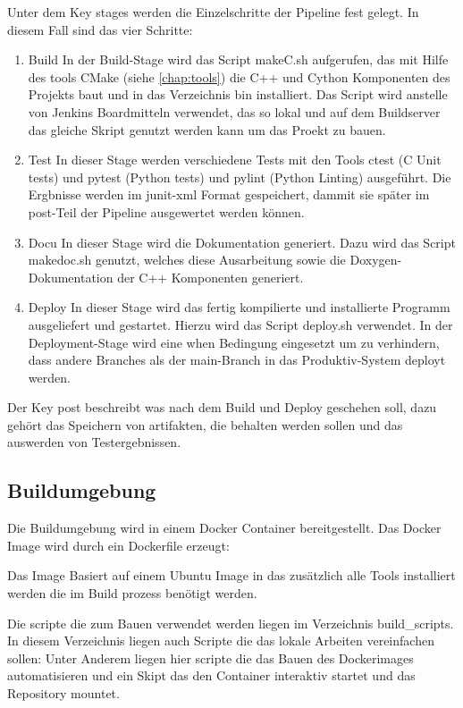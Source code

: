 Unter dem Key \glqq  stages\grqq{} werden die Einzelschritte der Pipeline fest gelegt. In diesem Fall sind das vier Schritte: 
\begin{enumerate}
    \item{Build} In der Build-Stage wird das Script makeC.sh aufgerufen, das mit Hilfe des tools CMake (siehe \autoref{chap:tools}) die C++ und Cython Komponenten des Projekts baut und in das Verzeichnis bin installiert. Das Script wird anstelle von Jenkins Boardmitteln verwendet, das so lokal und auf dem Buildserver das gleiche Skript genutzt werden kann um das Proekt zu bauen.
    \item{Test} In dieser Stage werden verschiedene Tests mit den Tools ctest (C Unit tests) und pytest (Python tests) und pylint (Python Linting) ausgeführt. Die Ergbnisse werden im junit-xml Format gespeichert, dammit sie später im post-Teil der Pipeline ausgewertet werden können.
    \item{Docu} In dieser Stage wird die Dokumentation generiert. Dazu wird das Script makedoc.sh genutzt, welches diese Ausarbeitung sowie die Doxygen-Dokumentation der C++ Komponenten generiert.  
    \item{Deploy} In dieser Stage wird das fertig kompilierte und installierte Programm ausgeliefert und gestartet. Hierzu wird das Script deploy.sh verwendet. 
    In der Deployment-Stage wird eine \glqq when\grqq{} Bedingung eingesetzt um zu verhindern, dass andere Branches als der main-Branch in das Produktiv-System deployt werden.  
\end{enumerate}

Der Key \glqq post\grqq{} beschreibt was nach dem Build und Deploy geschehen soll, dazu gehört das Speichern von artifakten, die behalten werden sollen und das auswerden von Testergebnissen.



\subsection{Buildumgebung}
Die Buildumgebung wird in einem Docker Container bereitgestellt. Das Docker Image wird durch ein Dockerfile erzeugt:



Das Image Basiert auf einem Ubuntu Image in das zusätzlich alle Tools installiert werden die im Build prozess benötigt werden.

Die scripte die zum Bauen verwendet werden liegen im Verzeichnis \glqq build\_scripts\grqq{}. In diesem Verzeichnis liegen auch Scripte die das lokale Arbeiten vereinfachen sollen: Unter Anderem liegen hier scripte die das Bauen des Dockerimages automatisieren und ein Skipt das den Container interaktiv startet und das Repository mountet.
